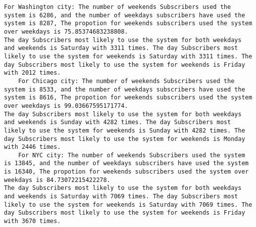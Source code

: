 \documentclass[11pt]{article}
\begin{document}
    \begin{Verbatim}[commandchars=\\\{\}]
    For Washington city: The number of weekends Subscribers used the system is 6286, and the number of weekdays subscribers have used the system is 8287, The propotion for weekends subscribers used the system over weekdays is 75.85374683238808.
The day Subscribers most likely to use the system for both weekdays and weekends is Saturday with 3311 times. The day Subscribers most likely to use the system for weekends is Saturday with 3311 times. The day Subscribers most likely to use the system for weekends is Friday with 2012 times.
    For Chicago city: The number of weekends Subscribers used the system is 8533, and the number of weekdays subscribers have used the system is 8616, The propotion for weekends subscribers used the system over weekdays is 99.03667595171774.
The day Subscribers most likely to use the system for both weekdays and weekends is Sunday with 4282 times. The day Subscribers most likely to use the system for weekends is Sunday with 4282 times. The day Subscribers most likely to use the system for weekends is Monday with 2446 times.
    For NYC city: The number of weekends Subscribers used the system is 13845, and the number of weekdays subscribers have used the system is 16340, The propotion for weekends subscribers used the system over weekdays is 84.73072215422278.
The day Subscribers most likely to use the system for both weekdays and weekends is Saturday with 7069 times. The day Subscribers most likely to use the system for weekends is Saturday with 7069 times. The day Subscribers most likely to use the system for weekends is Friday with 3670 times.

    \end{Verbatim}
\end{document}
